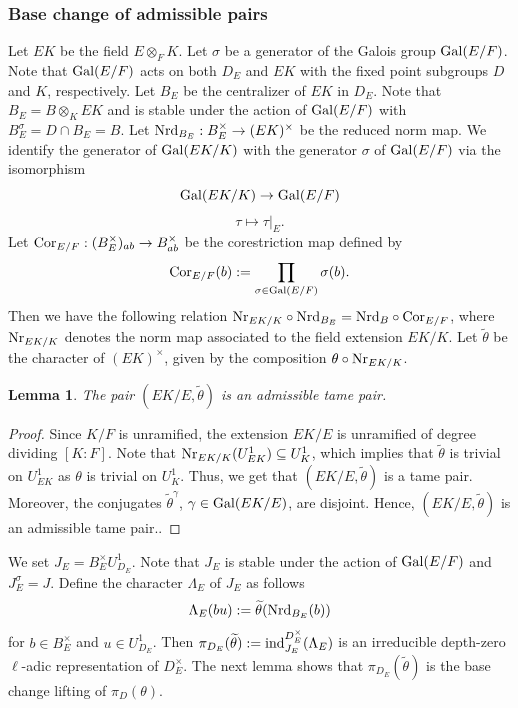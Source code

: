 \documentclass[10pt, reqno]{amsart}
\theoremstyle{plain}
\numberwithin{equation}{section}
\newtheorem{lemma}[theorem]{Lemma}
\begin{document}
\subsubsection{Base change of admissible pairs}
Let $EK$ be the field $E\otimes_F K$. Let $\sigma$ be a generator of the Galois group ${\rm Gal}(E/F)$. Note that ${\rm Gal}(E/F)$ acts on both $D_E$ and $EK$ with the fixed point subgroups $D$ and $K$, respectively. Let $B_E$ be the centralizer of $EK$ in $D_E$. Note that $B_E = B\otimes_K EK$ and is stable under the action of ${\rm Gal}(E/F)$ with $B_E^\sigma= D\cap B_E =B$. Let ${\rm Nrd}_{B_E}:B_E^\times\rightarrow (EK)^\times$ be the reduced norm map. We identify the generator of ${\rm Gal}(EK/K)$ with the generator $\sigma$ of ${\rm Gal}(E/F)$ via the isomorphism 
$$ {\rm Gal}(EK/K)\rightarrow {\rm Gal}(E/F) $$
$$ \tau\longmapsto \tau|_{E}. $$
Let ${\rm Cor}_{E/F}:(B_E^\times)_{ab}\rightarrow B^\times_{ab}$ be the corestriction map defined by 
$$ {\rm Cor}_{E/F}(b) :=\prod_{\sigma\in {\rm Gal}(E/F)}\sigma(b). $$
Then we have the following relation ${\rm Nr}_{EK/K}\circ {\rm Nrd}_{B_E} = {\rm Nrd}_B\circ {\rm Cor}_{E/F}$, where ${\rm Nr}_{EK/K}$ denotes the norm map associated to the field extension $EK/K$.
Let $\widetilde{\theta}$ be the character of $(EK)^\times$, given by the composition $\theta\circ{\rm Nr}_{EK/K}$.
\begin{lemma}
The pair $(EK/E,\widetilde{\theta})$ is an admissible tame pair.
\end{lemma}
\begin{proof}
Since $K/F$ is unramified, the extension $EK/E$ is unramified of degree dividing $[K:F]$. Note that ${\rm Nr}_{EK/K}(U_{EK}^1)\subseteq U_K^1$, which implies that $\widetilde{\theta}$ is trivial on $U_{EK}^1$ as $\theta$ is trivial on $U_K^1$. Thus, we get that $(EK/E,\widetilde{\theta})$ is a tame pair. Moreover, the conjugates $\widetilde{\theta}^\gamma$, $\gamma\in {\rm Gal}(EK/E)$, are disjoint. Hence, $(EK/E,\widetilde{\theta})$ is an admissible tame pair..
\end{proof}
We set $J_E = B_E^\times U_{D_E}^1$. Note that $J_E$ is stable under the action of ${\rm Gal}(E/F)$ and $J_E^\sigma = J$. Define the character $\Lambda_E$ of $J_E$ as follows 
$$ \Lambda_E(bu) := \widetilde{\theta}({\rm Nrd}_{B_E}(b)) $$
for $b\in B_E^\times$ and $u\in U_{D_E}^1$. Then $\pi_{D_E}(\widetilde{\theta}):={\rm ind}_{J_E}^{D_E^\times}(\Lambda_E)$ is an irreducible depth-zero $\ell$-adic representation of $D_E^\times$. The next lemma shows that $\pi_{D_E}(\widetilde{\theta})$ is the base change lifting of $\pi_D(\theta)$.
\end{document}
